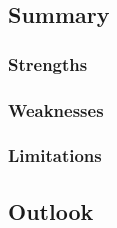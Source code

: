 \subsection{Summary}
\label{subsec:discussion_summary}



\subsubsection{Strengths}
\label{subsubsec:discussion_strengths}

\subsubsection{Weaknesses}
\label{subsubsec:discussion_weaknesses}

\subsubsection{Limitations}
\label{subsubsec:discussion_limitations}



\subsection{Outlook}
\label{subsec:discussion_outlook}


